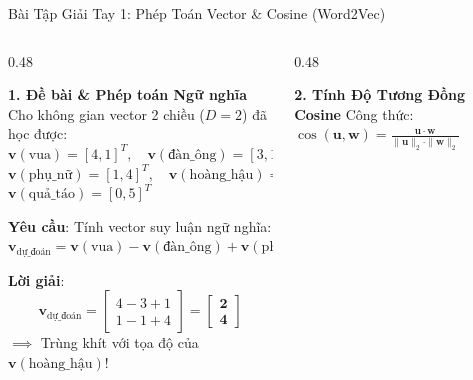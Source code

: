 \documentclass[aspectratio=169, 10pt]{beamer}
\begin{document}
\begin{frame}{Bài Tập Giải Tay 1: Phép Toán Vector \& Cosine (Word2Vec)}
  \begin{columns}[T, onlytextwidth]
    \begin{column}{0.48\textwidth}
      \begin{block}{\small\textbf{1. Đề bài \& Phép toán Ngữ nghĩa}}
        \fontsize{7}{8.8}\selectfont
        Cho không gian vector 2 chiều ($D=2$) đã học được:\\
        $\mathbf{v}(\text{vua}) = [4, 1]^T, \quad \mathbf{v}(\text{đàn\_ông}) = [3, 1]^T$\\
        $\mathbf{v}(\text{phụ\_nữ}) = [1, 4]^T, \quad \mathbf{v}(\text{hoàng\_hậu}) = [2, 4]^T$\\
        $\mathbf{v}(\text{quả\_táo}) = [0, 5]^T$
        \vspace{0.04cm}
        
        \textbf{Yêu cầu}: Tính vector suy luận ngữ nghĩa:\\
        $\mathbf{v}_{\text{dự\_đoán}} = \mathbf{v}(\text{vua}) - \mathbf{v}(\text{đàn\_ông}) + \mathbf{v}(\text{phụ\_nữ})$
        \vspace{0.04cm}
        
        \textbf{Lời giải}:
        $$\mathbf{v}_{\text{dự\_đoán}} = \begin{bmatrix} 4 - 3 + 1 \\ 1 - 1 + 4 \end{bmatrix} = \begin{bmatrix} \mathbf{2} \\ \mathbf{4} \end{bmatrix}$$
        $\implies$ Trùng khít với tọa độ của $\mathbf{v}(\text{hoàng\_hậu})$!
      \end{block}
    \end{column}
    \hfill
    \begin{column}{0.48\textwidth}
      \begin{exampleblock}{\small\textbf{2. Tính Độ Tương Đồng Cosine}}
        \fontsize{7}{8.8}\selectfont
        Công thức: $\cos(\mathbf{u}, \mathbf{w}) = \frac{\mathbf{u} \cdot \mathbf{w}}{\|\mathbf{u}\|_2 \cdot \|\mathbf{w}\|_2}$
        \vspace{0.02cm}
        

\end{exampleblock}
\end{column}
\end{columns}
\end{frame}
\end{document}
